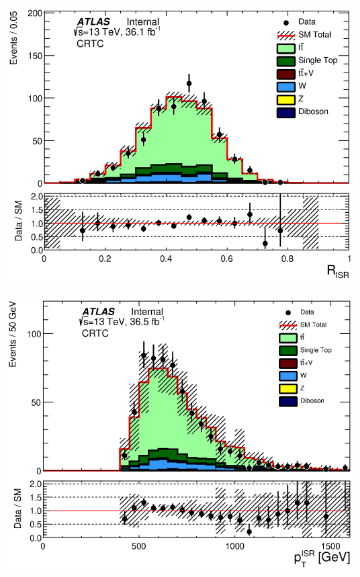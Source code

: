 \pagebreak

\begin{figure}[h!]
  \centering
        \begin{subfigure}[b]{0.40\textwidth}  
    \includegraphics[width=\textwidth]{figures/ttbar/postfit/CA_RISR_CRTopC}
               \caption{ }
    \end{subfigure}
            \begin{subfigure}[b]{0.40\textwidth}  
    \includegraphics[width=\textwidth]{figures/ttbar/postfit/CA_pTISR_CRTopC}
               \caption{ }
    \end{subfigure}
            \begin{subfigure}[b]{0.40\textwidth}  

\end{subfigure}
\end{figure}
